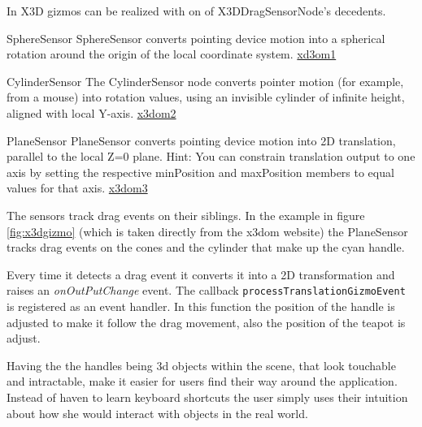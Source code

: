 In X3D gizmos can be realized with on of X3DDragSensorNode's \cite{x3ddragsensornode} decedents.
\begin{description}
  \item[]
\end{description}
\begin{description*}
\item[SphereSensor]
  SphereSensor converts pointing device motion into a spherical rotation around the origin of the local coordinate system. \href{http://doc.x3dom.org/author/PointingDeviceSensor/SphereSensor.html}{xd3om1}
\item[CylinderSensor]
  The CylinderSensor node converts pointer motion (for example, from a mouse) into rotation values, using an invisible cylinder of infinite height, aligned with local Y-axis. \href{http://doc.x3dom.org/author/PointingDeviceSensor/CylinderSensor.html}{x3dom2}
\item[PlaneSensor]
  PlaneSensor converts pointing device motion into 2D translation, parallel to the local Z=0 plane. Hint: You can constrain translation output to one axis by setting the respective minPosition and maxPosition members to equal values for that axis.
  \href{http://doc.x3dom.org/author/PointingDeviceSensor/PlaneSensor.html}{x3dom3}
\end{description*}

The sensors track drag events on their siblings. In the example in figure \ref{fig:x3dgizmo}
(which is taken directly from the x3dom website) the PlaneSensor tracks
drag events on the cones and the cylinder that make up the cyan handle.

Every time it detects a drag event it converts it into a 2D
transformation and raises an \emph{onOutPutChange} event. The callback
\texttt{processTranslationGizmoEvent} is registered as an event handler.
In this function the position of the handle is adjusted to make it
follow the drag movement, also the position of the teapot is adjust.

Having the the handles being 3d objects within the scene, that look
touchable and intractable, make it easier for users find their way
around the application. Instead of haven to learn keyboard shortcuts the
user simply uses their intuition about how she would interact with
objects in the real world.

